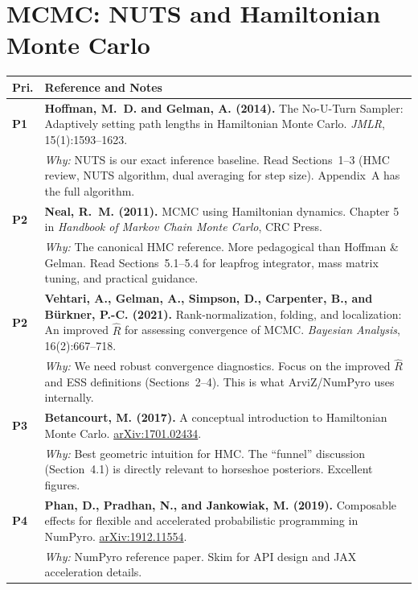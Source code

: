 \documentclass[11pt,a4paper]{article}
\begin{document}
\section{MCMC: NUTS and Hamiltonian Monte Carlo}

\begin{longtable}{@{}p{}p{}@{}}
\toprule
\textbf{Pri.} & \textbf{Reference and Notes} \\
\midrule
\endhead

\textcolor{P1}{\textbf{P1}} &
\textbf{Hoffman, M.~D. and Gelman, A. (2014).} The No-U-Turn Sampler: Adaptively setting path lengths in Hamiltonian Monte Carlo. \textit{JMLR}, 15(1):1593--1623. \\
& \textit{Why:} NUTS is our exact inference baseline. Read Sections~1--3 (HMC review, NUTS algorithm, dual averaging for step size). Appendix~A has the full algorithm. \\[0.8em]

\textcolor{P2}{\textbf{P2}} &
\textbf{Neal, R.~M. (2011).} MCMC using Hamiltonian dynamics. Chapter 5 in \textit{Handbook of Markov Chain Monte Carlo}, CRC Press. \\
& \textit{Why:} The canonical HMC reference. More pedagogical than Hoffman \& Gelman. Read Sections~5.1--5.4 for leapfrog integrator, mass matrix tuning, and practical guidance. \\[0.8em]

\textcolor{P2}{\textbf{P2}} &
\textbf{Vehtari, A., Gelman, A., Simpson, D., Carpenter, B., and B\"urkner, P.-C. (2021).} Rank-normalization, folding, and localization: An improved $\hat{R}$ for assessing convergence of MCMC. \textit{Bayesian Analysis}, 16(2):667--718. \\
& \textit{Why:} We need robust convergence diagnostics. Focus on the improved $\hat{R}$ and ESS definitions (Sections~2--4). This is what ArviZ/NumPyro uses internally. \\[0.8em]

\textcolor{P3}{\textbf{P3}} &
\textbf{Betancourt, M. (2017).} A conceptual introduction to Hamiltonian Monte Carlo. \href{https://arxiv.org/abs/1701.02434}{arXiv:1701.02434}. \\
& \textit{Why:} Best geometric intuition for HMC. The ``funnel'' discussion (Section~4.1) is directly relevant to horseshoe posteriors. Excellent figures. \\[0.8em]

\textcolor{P4}{\textbf{P4}} &
\textbf{Phan, D., Pradhan, N., and Jankowiak, M. (2019).} Composable effects for flexible and accelerated probabilistic programming in NumPyro. \href{https://arxiv.org/abs/1912.11554}{arXiv:1912.11554}. \\
& \textit{Why:} NumPyro reference paper. Skim for API design and JAX acceleration details. \\

\bottomrule
\end{longtable}
\end{document}
